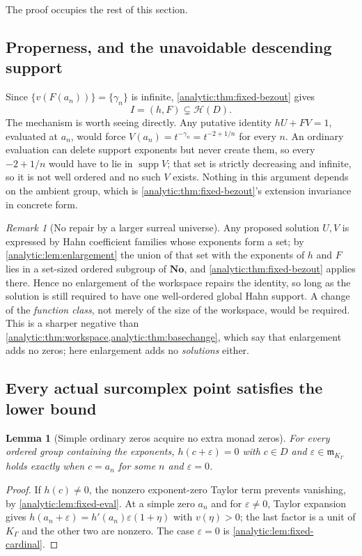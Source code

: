 \documentclass[11pt,letterpaper]{article}
\newtheorem{lemma}[theorem]{Lemma}
\theoremstyle{definition}
\theoremstyle{remark}
\newtheorem{remark}[theorem]{Remark}
\newcommand{\No}{\mathbf{No}}
\newcommand{\HH}{\mathcal H}
\newcommand{\m}{\mathfrak m}
\newcommand{\supp}{\operatorname{supp}}
\numberwithin{equation}{section}
\begin{document}
The proof occupies the rest of this section.

\subsection{Properness, and the unavoidable descending support}
\label{analytic:subsec:fixed-descending}
Since $\{v(F(a_n))\}=\{\gamma_n\}$ is infinite,
\cref{analytic:thm:fixed-bezout} gives
\begin{equation}\label{analytic:eq:fixed-proper-I}
 I=(h,F)\subsetneq\HH(D).
\end{equation}
The mechanism is worth seeing directly. Any putative identity $hU+FV=1$,
evaluated at $a_n$, would force $V(a_n)=t^{-\gamma_n}=t^{-2+1/n}$ for every
$n$. An ordinary evaluation can delete support exponents but never create
them, so every $-2+1/n$ would have to lie in $\supp V$; that set is
strictly decreasing and infinite, so it is not well ordered and no such $V$
exists. Nothing in this argument depends on the ambient group, which is
\cref{analytic:thm:fixed-bezout}'s extension invariance in concrete form.

\begin{remark}[No repair by a larger surreal universe]
\label{analytic:rem:fixed-extension}
Any proposed solution $U,V$ is expressed by Hahn coefficient families whose
exponents form a set; by \cref{analytic:lem:enlargement} the union of that
set with the exponents of $h$ and $F$ lies in a set-sized ordered subgroup
of $\No$, and \cref{analytic:thm:fixed-bezout} applies there. Hence no
enlargement of the workspace repairs the identity, so long as the solution
is still required to have one well-ordered global Hahn support. A change of
the \emph{function class}, not merely of the size of the workspace, would
be required. This is a sharper negative than
\cref{analytic:thm:workspace,analytic:thm:basechange}, which say that
enlargement adds no zeros; here enlargement adds no \emph{solutions}
either.
\end{remark}

\subsection{Every actual surcomplex point satisfies the lower bound}
\begin{lemma}[Simple ordinary zeros acquire no extra monad zeros]
\label{analytic:lem:fixed-hzeros}
For every ordered group containing the exponents, $h(c+\varepsilon)=0$ with
$c\in D$ and $\varepsilon\in\m_{K_\Gamma}$ holds exactly when $c=a_n$ for
some $n$ and $\varepsilon=0$.
\end{lemma}
\begin{proof}
If $h(c)\ne0$, the nonzero exponent-zero Taylor term prevents vanishing, by
\cref{analytic:lem:fixed-eval}. At a simple zero $a_n$ and for
$\varepsilon\ne0$, Taylor expansion gives
$h(a_n+\varepsilon)=h'(a_n)\varepsilon(1+\eta)$ with $v(\eta)>0$; the last
factor is a unit of $K_\Gamma$ and the other two are nonzero. The case
$\varepsilon=0$ is \cref{analytic:lem:fixed-cardinal}.
\end{proof}
\end{document}
